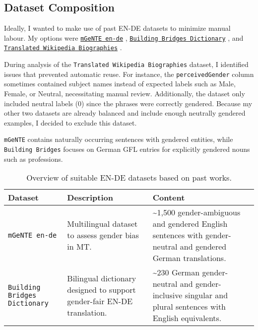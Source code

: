 \subsection{Dataset Composition}
Ideally, I wanted to make use of past EN-DE datasets to minimize manual labour. My options were \texttt{\href{https://huggingface.co/datasets/FBK-MT/mGeNTE}{mGeNTE en-de}} \parencite{savoldiMGeNTEMultilingualResource2025}, \texttt{\href{https://github.com/g8a9/building-bridges-gender-fair-german-mt}{Building Bridges Dictionary}} \parencite{lardelliBuildingBridgesDataset2024}, and \texttt{\href{https://research.google/blog/a-dataset-for-studying-gender-bias-in-translation/}{Translated Wikipedia Biographies}} \parencite{stellaDatasetStudyingGender2021}. 

During analysis of the \texttt{Translated Wikipedia Biographies} dataset, I identified issues that prevented automatic reuse. For instance, the \texttt{perceivedGender} column sometimes contained subject names instead of expected labels such as Male, Female, or Neutral, necessitating manual review. Additionally, the dataset only included neutral labels (0) since the phrases were correctly gendered. Because my other two datasets are already balanced and include enough neutrally gendered examples, I decided to exclude this dataset.

\texttt{mGeNTE} contains naturally occurring sentences with gendered entities, while \texttt{Building Bridges} focuses on German GFL entries for explicitly gendered nouns such as professions. 

\begin{table}[ht!]
    \centering
    \renewcommand{\arraystretch}{1.3}
    \begin{tabularx}{\textwidth}{|>{\raggedright\arraybackslash}X|>{\raggedright\arraybackslash}X|>{\raggedright\arraybackslash}X|}
    \hline
    \textbf{Dataset} & \textbf{Description} & \textbf{Content} \\ \hline
    \texttt{mGeNTE en-de} \parencite{savoldiMGeNTEMultilingualResource2025} & Multilingual dataset to assess gender bias in MT. & \textasciitilde1,500 gender-ambiguous and gendered English sentences with gender-neutral and gendered German translations. \\ \hline
    \texttt{Building Bridges Dictionary} \parencite{lardelliBuildingBridgesDataset2024} & Bilingual dictionary designed to support gender-fair EN-DE translation. & \textasciitilde230 German gender-neutral and gender-inclusive singular and plural sentences with English equivalents. \\ \hline
    \end{tabularx}
    \caption{Overview of suitable EN-DE datasets based on past works.}
    \label{tab:available_datasets}
\end{table}

